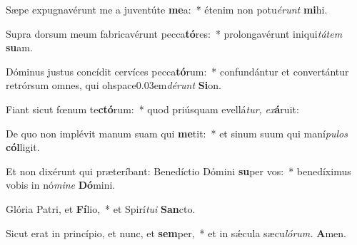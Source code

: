 \item Sæpe expugnavérunt me a juventúte \textbf{me}a:~* étenim non potu\hspace{0.03em}\textit{érunt} \textbf{mi}hi.
\item Supra dorsum meum fabricavérunt pecca\textbf{tó}res:~* prolongavérunt iniqui\textit{tátem} \textbf{su}am.
\item Dóminus justus concídit cervíces pecca\textbf{tó}rum:~* confundántur et convertántur retrórsum omnes, qui ohspace{0.03em}\textit{dérunt} \textbf{Si}on.
\item Fiant sicut fœnum te\textbf{ctó}rum:~* quod priúsquam evellá\hspace{0.03em}\textit{tur,} \textit{ex}\textbf{á}ruit:
\item De quo non implévit manum suam qui \textbf{me}tit:~* et sinum suum qui maní\textit{pulos} \textbf{cól}ligit.
\item Et non dixérunt qui præteríbant: Benedíctio Dómini \textbf{su}per vos:~* benedíximus vobis in nó\textit{mine} \textbf{Dó}mini.
\item Glória Patri, et \textbf{Fí}lio,~* et Spirí\textit{tu}\textit{i} \textbf{San}cto.
\item Sicut erat in princípio, et nunc, et \textbf{sem}per,~* et in sǽcula sæcu\hspace{0.03em}\textit{lórum.} \textbf{A}men.
